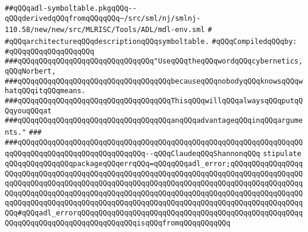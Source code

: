 \label{src/lib/compiler/back/low/tools/arch/adl-symboltable.pkg}
\verb|##qQQqadl-symboltable.pkgqQQq--qQQqderivedqQQqfromqQQqqQQq~/src/sml/nj/smlnj-110.58/new/new/src/MLRISC/Tools/ADL/mdl-env.sml|\newline
\verb|#|\newline
\verb|#qQQqarchitectureqQQqdescriptionqQQqsymboltable.|\newline
\newline
\verb|#qQQqCompiledqQQqby:|\newline
\verb|#qQQqqQQqqQQqqQQqqQQq|\newline
\newline
\newline
\newline
\verb|###qQQqqQQqqQQqqQQqqQQqqQQqqQQqqQQq"UseqQQqtheqQQqwordqQQqcybernetics,qQQqNorbert,|\newline
\verb|###qQQqqQQqqQQqqQQqqQQqqQQqqQQqqQQqqQQqbecauseqQQqnobodyqQQqknowsqQQqwhatqQQqitqQQqmeans.|\newline
\verb|###qQQqqQQqqQQqqQQqqQQqqQQqqQQqqQQqqQQqThisqQQqwillqQQqalwaysqQQqputqQQqyouqQQqat|\newline
\verb|###qQQqqQQqqQQqqQQqqQQqqQQqqQQqqQQqqQQqanqQQqadvantageqQQqinqQQqarguments."|\newline
\verb|###|\newline
\verb|###qQQqqQQqqQQqqQQqqQQqqQQqqQQqqQQqqQQqqQQqqQQqqQQqqQQqqQQqqQQqqQQqqQQqqQQqqQQqqQQqqQQqqQQqqQQqqQQqqQQq--qQQqClaudeqQQqShannonqQQq|\newline
\newline
\newline
\newline
\verb|stipulate|\newline
\verb|qQQqqQQqqQQqqQQqpackageqQQqerrqQQq=qQQqqQQqadl_error;qQQqqQQqqQQqqQQqqQQqqQQqqQQqqQQqqQQqqQQqqQQqqQQqqQQqqQQqqQQqqQQqqQQqqQQqqQQqqQQqqQQqqQQqqQQqqQQqqQQqqQQqqQQqqQQqqQQqqQQqqQQqqQQqqQQqqQQqqQQqqQQqqQQqqQQqqQQqqQQqqQQqqQQqqQQqqQQqqQQqqQQqqQQqqQQqqQQqqQQqqQQqqQQqqQQqqQQqqQQqqQQqqQQqqQQqqQQqqQQqqQQqqQQqqQQqqQQqqQQqqQQqqQQqqQQqqQQqqQQqqQQqqQQqqQQqqQQqqQQq#qQQqadl_errorqQQqqQQqqQQqqQQqqQQqqQQqqQQqqQQqqQQqqQQqqQQqqQQqqQQqqQQqqQQqqQQqqQQqqQQqqQQqqQQqqQQqisqQQqfromqQQqqQQqqQQq|\newline
